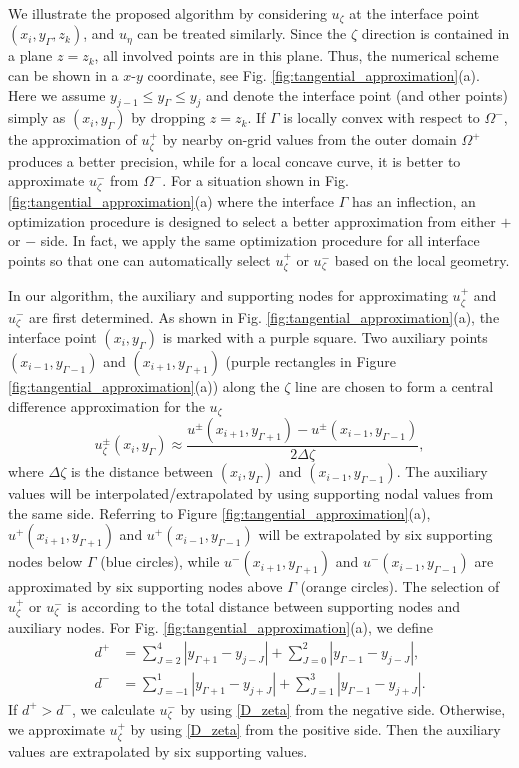 \documentclass[dissertation]{uathesis}
\begin{document}
\begin{body}
We illustrate the proposed algorithm by considering $u_{\zeta}$ at the interface point $(x_i,y_{\Gamma},z_k)$, and $u_{\eta}$ can be treated similarly. Since the $\zeta$ direction is contained in a plane $z=z_{k}$, all involved points are in this plane. Thus, the numerical scheme  can be shown in a $x$-$y$ coordinate, see Fig. \ref{fig:tangential_approximation}(a).
Here  we assume $y_{j-1} \le y_{\Gamma} \le y_{j}$ and denote the interface point (and other points) simply as $(x_i,y_{\Gamma})$ by dropping $z=z_k$. 
If $\Gamma$ is locally convex with respect to $\Omega^-$, the approximation of $u^{+}_{\zeta}$ by nearby on-grid values from the outer domain $\Omega^+$ produces a better precision, while for a local concave curve, it is better to approximate $u^{-}_{\zeta}$ from  $\Omega^-$. For a situation shown in Fig. \ref{fig:tangential_approximation}(a) where the interface $\Gamma$ has an inflection, an optimization procedure is designed to select a better approximation from either $+$ or $-$ side. In fact, we apply the same optimization procedure for all interface points so that one can automatically select $u^{+}_{\zeta}$ or $u^{-}_{\zeta}$ based on the local geometry. 

In our algorithm, the auxiliary and supporting nodes for approximating $u^{+}_{\zeta}$ and $u^{-}_{\zeta}$ are first determined. As shown in Fig. \ref{fig:tangential_approximation}(a), the interface point $(x_i,y_{\Gamma})$ is marked with a purple square. Two auxiliary points$(x_{i-1},y_{\Gamma-1})$ and $(x_{i+1},y_{\Gamma+1})$ (purple rectangles in Figure \ref{fig:tangential_approximation}(a)) along the $\zeta$ line are chosen to form a central difference approximation for the $u_{\zeta}$
\begin{equation}\label{D_zeta}
u^{\pm}_{\zeta} (x_i,y_{\Gamma})\approx \frac{u^{\pm}(x_{i+1},y_{\Gamma+1}) - u^{\pm}(x_{i-1},y_{\Gamma-1})}{2 \Delta \zeta}, 
\end{equation}
where $\Delta \zeta$ is the distance between $(x_i,y_{\Gamma})$ and $(x_{i-1},y_{\Gamma-1})$. The auxiliary values will be interpolated/extrapolated by using supporting nodal values from the same side. 
Referring to Figure \ref{fig:tangential_approximation}(a), $u^{+}(x_{i+1},y_{\Gamma+1})$ and $u^{+}(x_{i-1},y_{\Gamma-1})$ will be extrapolated by six supporting nodes below $\Gamma$ (blue circles), while $u^{-}(x_{i+1},y_{\Gamma+1})$ and $u^{-}(x_{i-1},y_{\Gamma-1})$ are approximated by six  supporting nodes above $\Gamma$ (orange circles). The selection of $u^{+}_{\zeta}$ or $u^{-}_{\zeta}$ is according to the total distance between supporting nodes and auxiliary nodes. For Fig. \ref{fig:tangential_approximation}(a), we define
\begin{align}
d^+ & =\sum_{J=2}^4 |y_{\Gamma+1}-y_{j-J}| 
+\sum_{J=0}^2 |y_{\Gamma-1}-y_{j-J}|,   \\
d^- & =\sum_{J=-1}^1 |y_{\Gamma+1}-y_{j+J}| 
+\sum_{J=1}^3 |y_{\Gamma-1}-y_{j+J}|. 
\end{align}    
If $d^+ > d^-$, we calculate $u^{-}_{\zeta}$ by using \eqref{D_zeta} from the negative side. Otherwise, we approximate $u^{+}_{\zeta}$ by using \eqref{D_zeta} from the positive side. Then the auxiliary values are extrapolated by six supporting values. 



\end{body}
\end{document}

